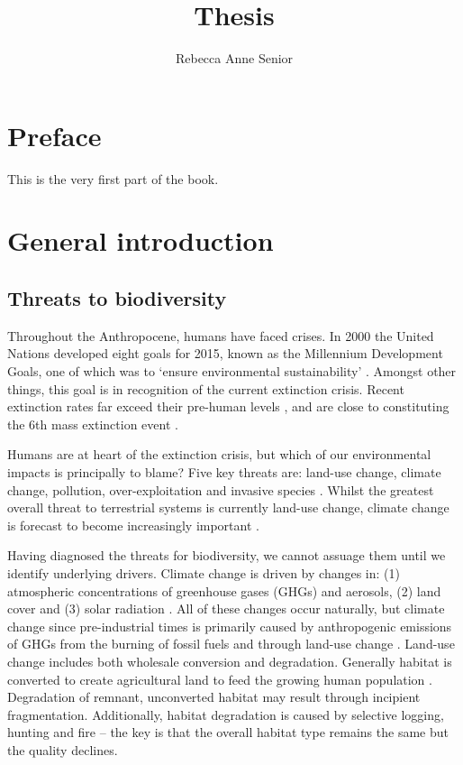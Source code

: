 \documentclass[12pt,a4paper,]{report}
\title{Thesis}
\author{Rebecca Anne Senior}
\date{}
\theoremstyle{definition}
\theoremstyle{definition}
\theoremstyle{definition}
\theoremstyle{remark}
\begin{document}
\maketitle

{
\setcounter{tocdepth}{1}
\tableofcontents
}
\listoftables
\listoffigures
\chapter*{Preface}\label{preface}

This is the very first part of the book.

\chapter{General introduction}\label{general-introduction}

\section{Threats to biodiversity}\label{threats-to-biodiversity}

Throughout the Anthropocene, humans have faced crises. In 2000 the
United Nations developed eight goals for 2015, known as the Millennium
Development Goals, one of which was to `ensure environmental
sustainability' \citep{united_nations_united2014}. Amongst other things,
this goal is in recognition of the current extinction crisis. Recent
extinction rates far exceed their pre-human levels
\citep{pimm_future1995}, and are close to constituting the 6th mass
extinction event \citep{barnosky_has2011}.

Humans are at heart of the extinction crisis, but which of our
environmental impacts is principally to blame? Five key threats are:
land-use change, climate change, pollution, over-exploitation and
invasive species \citep{hirsch_global2010}. Whilst the greatest overall
threat to terrestrial systems is currently land-use change, climate
change is forecast to become increasingly important
\citep{sala_global2000}.

Having diagnosed the threats for biodiversity, we cannot assuage them
until we identify underlying drivers. Climate change is driven by
changes in: (1) atmospheric concentrations of greenhouse gases (GHGs)
and aerosols, (2) land cover and (3) solar radiation \citep{ipcc2013}.
All of these changes occur naturally, but climate change since
pre-industrial times is primarily caused by anthropogenic emissions of
GHGs from the burning of fossil fuels and through land-use change
\citep{ipcc2013}. Land-use change includes both wholesale conversion and
degradation. Generally habitat is converted to create agricultural land
to feed the growing human population
\citep{foley_solutions2011, godfray_food2010}. Degradation of remnant,
unconverted habitat may result through incipient fragmentation.
Additionally, habitat degradation is caused by selective logging,
hunting and fire -- the key is that the overall habitat type remains the
same but the quality declines.
\end{document}
